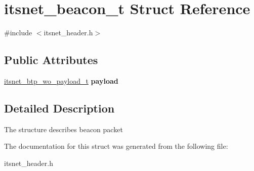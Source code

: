 \hypertarget{structitsnet__beacon__t}{\section{itsnet\-\_\-beacon\-\_\-t \-Struct \-Reference}
\label{structitsnet__beacon__t}
}


{\ttfamily \#include $<$itsnet\-\_\-header.\-h$>$}

\subsection*{\-Public \-Attributes}
\begin{DoxyCompactItemize}
\item 
\hypertarget{structitsnet__beacon__t_afea39a2d9627607c7f925fff3907dce1}{\hyperlink{structitsnet__btp__wo__payload}{itsnet\-\_\-btp\-\_\-wo\-\_\-payload\-\_\-t} {\bfseries payload}}\label{structitsnet__beacon__t_afea39a2d9627607c7f925fff3907dce1}

\end{DoxyCompactItemize}


\subsection{\-Detailed \-Description}
\-The structure describes beacon packet 

\-The documentation for this struct was generated from the following file\-:\begin{DoxyCompactItemize}
\item 
itsnet\-\_\-header.\-h\end{DoxyCompactItemize}
